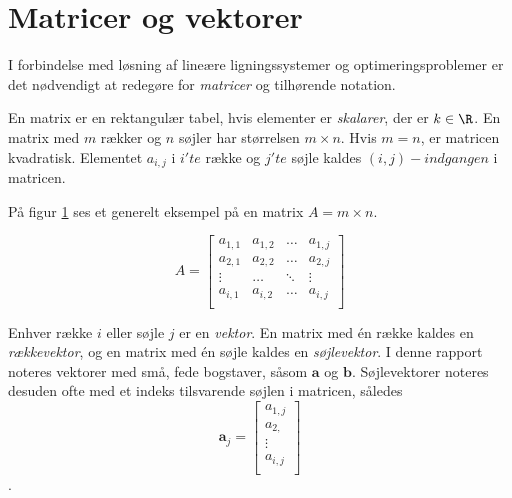 \section{Matricer og vektorer}


I forbindelse med løsning af lineære ligningssystemer og optimeringsproblemer er det nødvendigt at redegøre for \textit{matricer} og tilhørende notation. 

\begin{defn}{}{}
En matrix er en rektangulær tabel, hvis elementer er \textit{skalarer}, der er $k \in \R$. 
En matrix med $m$ rækker og $n$ søjler har størrelsen $m \times n$.
Hvis $m=n$, er matricen kvadratisk. 
Elementet $a_{i,j}$ i $i'te$ række og $j'te$ søjle kaldes $(i,j)-indgangen$ i matricen. 
\end{defn}

På figur \ref{fig:matrix_gen_eks} ses et generelt eksempel på en matrix $A = m \times n$.

\begin{figure}[H] \label{fig:matrix_gen_eks}
	\begin{center}
$$
A=
\begin{bmatrix}
a_{1,1} & a_{1,2} & \ldots & a_{1,j} \\
a_{2,1} & a_{2,2} & \ldots & a_{2,j} \\
\vdots  & \ldots  & \ddots & \vdots \\
a_{i,1} & a_{i,2} & \ldots & a_{i,j} \\
\end{bmatrix}
$$
	\end{center}
\end{figure}

Enhver række $i$ eller søjle $j$ er en \textit{vektor}. En matrix med én række kaldes en \textit{rækkevektor}, og en matrix med én søjle kaldes en \textit{søjlevektor}. I denne rapport noteres vektorer med små, fede bogstaver, såsom $\textbf{a}$ og $\textbf{b}$. Søjlevektorer noteres desuden ofte med et indeks tilsvarende søjlen i matricen, således 
$$
\textbf{a}_j= 
\begin{bmatrix}
a_{1,j} \\
a_{2,} \\
\vdots \\
a_{i,j} \\
\end{bmatrix}
$$. 










